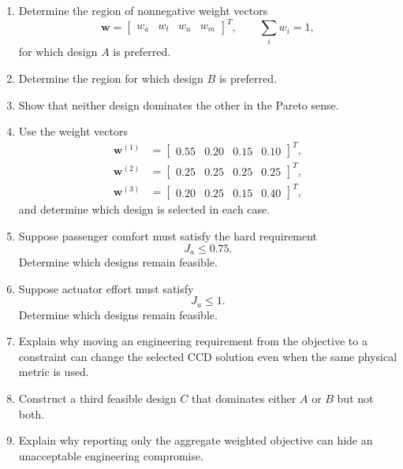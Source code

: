 \begin{enumerate}
    \item Determine the region of nonnegative weight vectors
    \begin{equation}
    \mathbf{w}
    =
    \begin{bmatrix}
    w_a&w_t&w_u&w_m
    \end{bmatrix}^{T},
    \qquad
    \sum_iw_i=1,
    \end{equation}
    for which design $A$ is preferred.

    \item Determine the region for which design $B$ is preferred.

    \item Show that neither design dominates the other in the Pareto sense.

    \item Use the weight vectors
    \begin{align}
    \mathbf{w}^{(1)}
    &=
    \begin{bmatrix}
    0.55&0.20&0.15&0.10
    \end{bmatrix}^{T},
    \\
    \mathbf{w}^{(2)}
    &=
    \begin{bmatrix}
    0.25&0.25&0.25&0.25
    \end{bmatrix}^{T},
    \\
    \mathbf{w}^{(3)}
    &=
    \begin{bmatrix}
    0.20&0.25&0.15&0.40
    \end{bmatrix}^{T},
    \end{align}
    and determine which design is selected in each case.

    \item Suppose passenger comfort must satisfy the hard requirement
    \begin{equation}
    J_a\leq0.75.
    \end{equation}
    Determine which designs remain feasible.

    \item Suppose actuator effort must satisfy
    \begin{equation}
    J_u\leq1.
    \end{equation}
    Determine which designs remain feasible.

    \item Explain why moving an engineering requirement from the objective
    to a constraint can change the selected CCD solution even when the same
    physical metric is used.

    \item Construct a third feasible design $C$ that dominates either $A$
    or $B$ but not both.

    \item Explain why reporting only the aggregate weighted objective can
    hide an unacceptable engineering compromise.
\end{enumerate}


